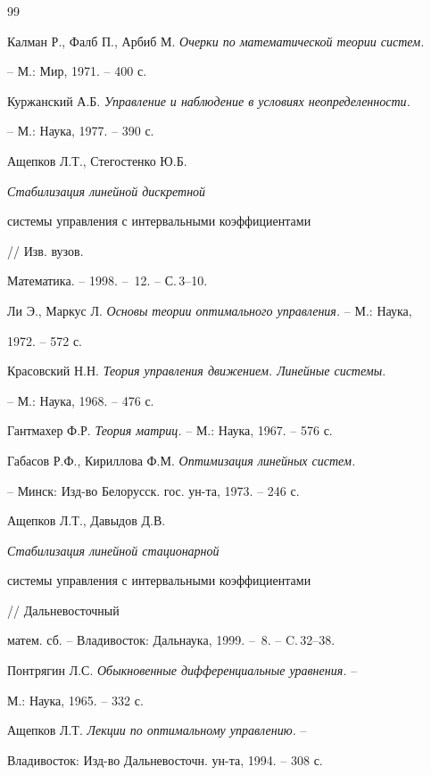 \begin{thebibliography}{99}







Калман Р., Фалб П., Арбиб М. { \it Очерки по математической теории систем.}


-- М.: Мир, 1971. -- 400 с.




Куржанский А.Б. {\it Управление и наблюдение в условиях неопределенности.}


-- М.: Наука, 1977. -- 390 с.




Ащепков Л.Т., Стегостенко Ю.Б. { \it Стабилизация линейной дискретной


системы управления с интервальными коэффициентами} // Изв. вузов.


Математика. -- 1998. -- \No\,12. -- С.\,3--10.




Ли Э., Маркус Л. {\it Основы теории оптимального управления.} -- М.: Наука,


1972. -- 572 с.




Красовский Н.Н. { \it Теория управления движением. Линейные системы}.


-- М.: Наука, 1968. -- 476 с.




Гантмахер Ф.Р. { \it Теория матриц.} -- М.: Наука, 1967. -- 576 с.




Габасов Р.Ф., Кириллова Ф.М. { \it Оптимизация линейных систем.}


-- Минск: Изд-во Белорусск. гос. ун-та, 1973. -- 246 с.




Ащепков Л.Т., Давыдов Д.В. { \it Стабилизация линейной стационарной


системы управления с интервальными коэффициентами} // Дальневосточный


матем. сб. -- Владивосток: Дальнаука, 1999. -- \No\,8. --  C.\,32--38.




Понтрягин Л.С. { \it Обыкновенные дифференциальные уравнения.} --


М.: Наука, 1965. -- 332 с.




Ащепков Л.Т. { \it Лекции по оптимальному управлению.} -- 


Владивосток: Изд-во Дальневосточн. ун-та, 1994. -- 308 с.





\end{thebibliography}





